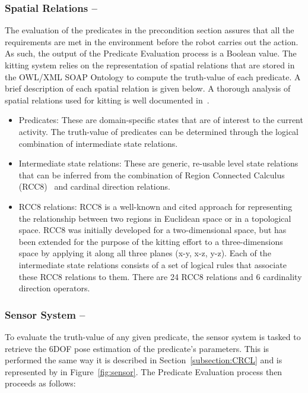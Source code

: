 \subsubsection{Spatial Relations -- }
 The evaluation of the predicates in the precondition section assures that all the requirements are met in the environment before the robot carries out the action. As such, the output of the \textsf{Predicate Evaluation} process is a Boolean value. The kitting system relies on the representation of spatial relations that are stored in the \textsf{OWL/XML SOAP Ontology} to compute the truth-value of each predicate. A brief description of each spatial relation is given below. A thorough analysis of spatial relations used for kitting is well documented in~\cite{SCHLENOFF.RAS.2013}.
\begin{itemize}
 \item Predicates: These are domain-specific states that are of interest to the current activity. The truth-value of predicates can be determined through the logical combination of intermediate state relations.
\item Intermediate state relations: These are generic, re-usable level state relations that can be inferred from the combination of Region Connected Calculus (RCC8)~\cite{Wolter2000} and cardinal direction relations.
\item RCC8 relations: RCC8 is a well-known and cited approach for representing the relationship between two regions in Euclidean space or in a topological space. RCC8 was initially developed for a two-dimensional space, but has been extended for the purpose of the kitting effort to a three-dimensions space by applying it along all three planes (x-y, x-z, y-z). Each of the intermediate state relations consists of a set of logical rules that associate these RCC8 relations to them. There are 24 RCC8 relations and 6 cardinality direction operators.
\end{itemize}

\subsubsection{Sensor System -- }
To evaluate the truth-value of any given predicate, the sensor system is tasked to retrieve the 6DOF pose estimation of the predicate's parameters. This is performed the same way it is described in Section~\ref{subsection:CRCL} and is represented by  in Figure~\ref{fig:sensor}. The \textsf{Predicate Evaluation} process then proceeds as follows:

